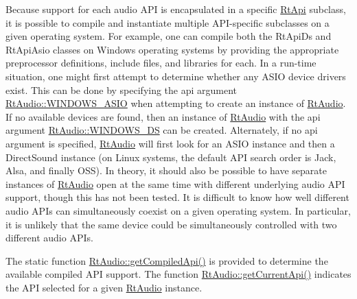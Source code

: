 Because support for each audio A\+PI is encapsulated in a specific \mbox{\hyperlink{class_rt_api}{Rt\+Api}} subclass, it is possible to compile and instantiate multiple A\+P\+I-\/specific subclasses on a given operating system. For example, one can compile both the Rt\+Api\+Ds and Rt\+Api\+Asio classes on Windows operating systems by providing the appropriate preprocessor definitions, include files, and libraries for each. In a run-\/time situation, one might first attempt to determine whether any A\+S\+IO device drivers exist. This can be done by specifying the api argument \mbox{\hyperlink{class_rt_audio_ac9b6f625da88249d08a8409a9db0d849a219517d1df90f94d07758481155bd469}{Rt\+Audio\+::\+W\+I\+N\+D\+O\+W\+S\+\_\+\+A\+S\+IO}} when attempting to create an instance of \mbox{\hyperlink{class_rt_audio}{Rt\+Audio}}. If no available devices are found, then an instance of \mbox{\hyperlink{class_rt_audio}{Rt\+Audio}} with the api argument \mbox{\hyperlink{class_rt_audio_ac9b6f625da88249d08a8409a9db0d849a28478830f42c2fd61e6c7ad498901931}{Rt\+Audio\+::\+W\+I\+N\+D\+O\+W\+S\+\_\+\+DS}} can be created. Alternately, if no api argument is specified, \mbox{\hyperlink{class_rt_audio}{Rt\+Audio}} will first look for an A\+S\+IO instance and then a Direct\+Sound instance (on Linux systems, the default A\+PI search order is Jack, Alsa, and finally O\+SS). In theory, it should also be possible to have separate instances of \mbox{\hyperlink{class_rt_audio}{Rt\+Audio}} open at the same time with different underlying audio A\+PI support, though this has not been tested. It is difficult to know how well different audio A\+P\+Is can simultaneously coexist on a given operating system. In particular, it is unlikely that the same device could be simultaneously controlled with two different audio A\+P\+Is.

The static function \mbox{\hyperlink{class_rt_audio_a1df0b60d45637f65dab961b658056503}{Rt\+Audio\+::get\+Compiled\+Api()}} is provided to determine the available compiled A\+PI support. The function \mbox{\hyperlink{class_rt_audio_a83687634795792b2c47e4ae1cf8a5246}{Rt\+Audio\+::get\+Current\+Api()}} indicates the A\+PI selected for a given \mbox{\hyperlink{class_rt_audio}{Rt\+Audio}} instance. 
